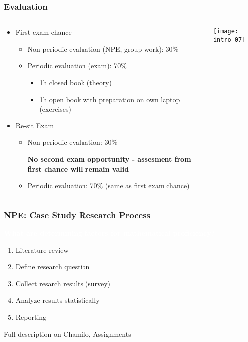 \documentclass[aspectratio=169]{beamer}
\newcommand{\alertbox}[1]{%
  \begin{center}
    \colorbox{hgblue}{\textcolor{white}{\textbf{#1}}}
  \end{center}
}
\begin{document}
\begin{frame}
  \frametitle{Evaluation}

  \begin{columns}
    \begin{column}{.8\textwidth}
      \begin{itemize}
        \item First exam chance
        \begin{itemize}
          \item Non-periodic evaluation (NPE, group work): 30\%
          \item Periodic evaluation (exam): 70\%
          \begin{itemize}
            \item 1h closed book (theory)
            \item 1h open book with preparation on own laptop (exercises)
          \end{itemize}
        \end{itemize}
        \item Re-sit Exam
        \begin{itemize}
          \item Non-periodic evaluation: 30\%
          
          \textbf{No second exam opportunity - assesment from first chance will remain valid}
          \item Periodic evaluation: 70\% (same as first exam chance)
        \end{itemize}
      \end{itemize}
    \end{column}
    \begin{column}{.2\textwidth}
      \texttt{[image: intro-07]}
    \end{column}
  \end{columns}

\end{frame}

\begin{frame}
  \frametitle{NPE: Case Study Research Process}
  
  \alertbox{What are determining factors for mathematical proficiency?}
  
  \begin{enumerate}
    \item Literature review
    \item Define research question
    \item Collect resarch results (survey)
    \item Analyze results statistically
    \item Reporting
  \end{enumerate}
  
  Full description on Chamilo, Assignments
\end{frame}
\end{document}
